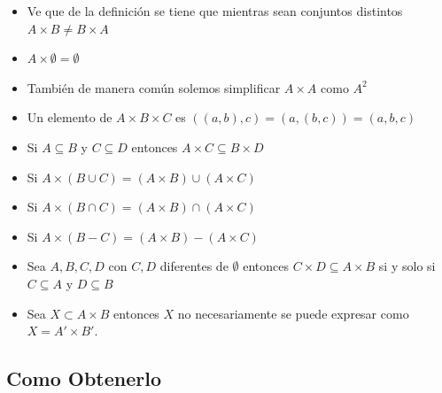 \documentclass[12pt, fleqn]{report}                             %
\theoremstyle{break}                                            %
\begin{document}
                \begin{itemize}
                    \item Ve que de la definición se tiene que mientras sean conjuntos distintos 
                        $ A \times B \neq B \times A$

                    \item $A \times \emptyset = \emptyset$

                    \item También de manera común solemos simplificar $A \times A$ como $A^2$

                    \item Un elemento de $A \times B \times C$ es $((a,b),c) = (a,(b,c)) = (a,b,c)$

                    \item Si $A \subseteq B$ y $C \subseteq D$ entonces $A \times C \subseteq B \times D$ 

                    \item Si $A \times (B \cup C) = (A \times B) \cup (A \times C)$ 

                    \item Si $A \times (B \cap C) = (A \times B) \cap (A \times C)$ 

                    \item Si $A \times (B - C) = (A \times B) - (A \times C)$

                    \item Sea $A, B, C, D$ con $C, D$ diferentes de $\emptyset$
                        entonces $C \times D \subseteq A \times B$ si y solo si $C \subseteq A$
                        y $D \subseteq B$

                    \item Sea $X \subset A \times B$ entonces $X$ no necesariamente se puede expresar
                    como $X = A' \times B'$.


                \end{itemize}



            \clearpage
            \subsection{Como Obtenerlo}
\end{document}
